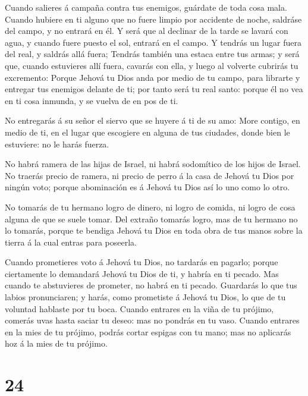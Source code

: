  Cuando salieres á campaña contra tus enemigos, guárdate de
toda cosa mala.  Cuando hubiere en ti alguno que no fuere
limpio por accidente de noche, saldráse del campo, y no entrará en él.
 Y será que al declinar de la tarde se lavará con agua, y
cuando fuere puesto el sol, entrará en el campo.  Y tendrás
un lugar fuera del real, y saldrás allá fuera;  Tendrás
también una estaca entre tus armas; y será que, cuando estuvieres allí
fuera, cavarás con ella, y luego al volverte cubrirás tu excremento:
 Porque Jehová tu Dios anda por medio de tu campo, para
librarte y entregar tus enemigos delante de ti; por tanto será tu real
santo: porque él no vea en ti cosa inmunda, y se vuelva de en pos de ti.

 No entregarás á su señor el siervo que se huyere á ti de
su amo:  More contigo, en medio de ti, en el lugar que
escogiere en alguna de tus ciudades, donde bien le estuviere: no le
harás fuerza.

 No habrá ramera de las hijas de Israel, ni habrá
sodomítico de los hijos de Israel.  No traerás precio de
ramera, ni precio de perro á la casa de Jehová tu Dios por ningún voto;
porque abominación es á Jehová tu Dios así lo uno como lo otro.

 No tomarás de tu hermano logro de dinero, ni logro de
comida, ni logro de cosa alguna de que se suele tomar.  Del
extraño tomarás logro, mas de tu hermano no lo tomarás, porque te
bendiga Jehová tu Dios en toda obra de tus manos sobre la tierra á la
cual entras para poseerla.

 Cuando prometieres voto á Jehová tu Dios, no tardarás en
pagarlo; porque ciertamente lo demandará Jehová tu Dios de ti, y habría
en ti pecado.  Mas cuando te abstuvieres de prometer, no
habrá en ti pecado.  Guardarás lo que tus labios
pronunciaren; y harás, como prometiste á Jehová tu Dios, lo que de tu
voluntad hablaste por tu boca.  Cuando entrares en la viña
de tu prójimo, comerás uvas hasta saciar tu deseo: mas no pondrás en tu
vaso.  Cuando entrares en la mies de tu prójimo, podrás
cortar espigas con tu mano; mas no aplicarás hoz á la mies de tu
prójimo.

\hypertarget{section-23}{%
\section{24}\label{section-23}}

